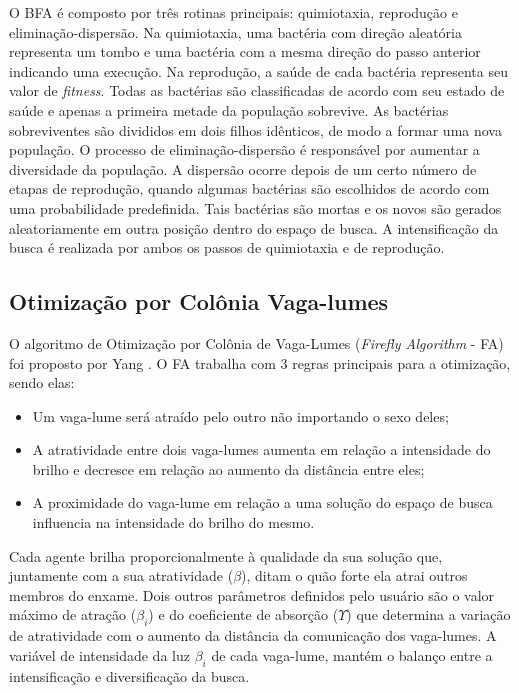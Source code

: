 O BFA é composto por três rotinas principais: quimiotaxia, reprodução e eliminação-dispersão. Na quimiotaxia, uma bactéria com direção aleatória representa um tombo e uma bactéria com a mesma direção do passo anterior indicando uma execução. Na reprodução, a saúde de cada bactéria representa seu valor de \textit{fitness}. Todas as bactérias são classificadas de acordo com seu estado de saúde e apenas a primeira metade da população sobrevive. As bactérias sobreviventes são divididos em dois filhos idênticos, de modo a formar uma nova população. O processo de eliminação-dispersão é responsável por aumentar a diversidade da população. A dispersão ocorre depois de um certo número de etapas de reprodução, quando algumas bactérias são escolhidos de acordo com uma probabilidade predefinida. Tais bactérias são mortas e os novos são gerados aleatoriamente em outra posição dentro do espaço de busca. A intensificação da busca é realizada por ambos os passos de quimiotaxia e de reprodução.

\subsection{Otimização por Colônia Vaga-lumes}
\label{sec:firefly_algorithm}
O algoritmo de Otimização por Colônia de Vaga-Lumes (\textit{Firefly Algorithm} - FA) foi proposto por Yang \cite{firefly}. O FA trabalha com 3 regras principais para a otimização, sendo elas:

\begin{itemize}
\item Um vaga-lume será atraído pelo outro não importando o sexo deles;

\item A atratividade entre dois vaga-lumes aumenta em relação a intensidade do brilho e decresce em relação ao aumento da distância entre eles;

\item A proximidade do vaga-lume em relação a uma solução do espaço de busca influencia na intensidade do brilho do mesmo.
\end{itemize}

Cada agente brilha proporcionalmente à qualidade da sua solução que, juntamente com a sua atratividade ($\beta$), ditam o quão forte ela atrai outros membros do enxame. Dois outros parâmetros definidos pelo usuário são o valor máximo de atração ($\beta_i$) e do coeficiente de absorção ($\Upsilon$) que determina a variação de atratividade com o aumento da distância da comunicação dos vaga-lumes. A variável
de intensidade da luz $\beta_i$ de cada vaga-lume, mantém o balanço entre a intensificação e diversificação da busca.

